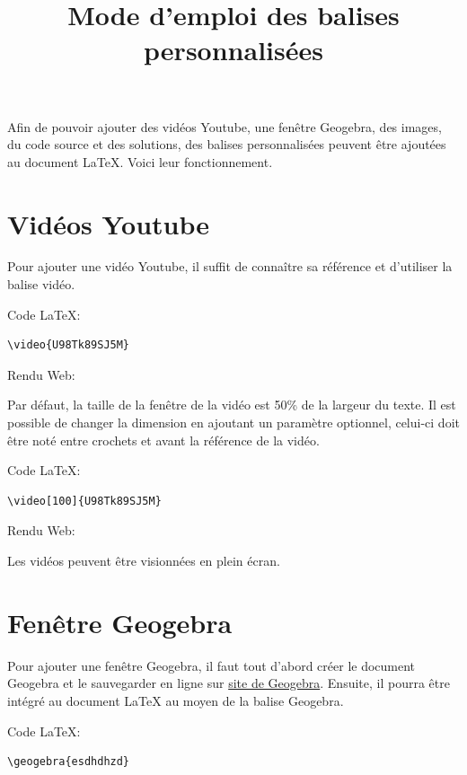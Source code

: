 \documentclass[a4paper,11pt]{article}
\begin{document}
\title{Mode d'emploi des balises personnalisées}
\date{}
\maketitle

Afin de pouvoir ajouter des vidéos Youtube, une fenêtre Geogebra, des images, du code source et des
solutions, des balises personnalisées peuvent être ajoutées au document LaTeX. Voici leur fonctionnement.

\section{Vidéos Youtube}
Pour ajouter une vidéo Youtube, il suffit de connaître sa référence et d’utiliser la balise vidéo.\par

Code LaTeX:
\begin{lstlisting}
\video{U98Tk89SJ5M}
\end{lstlisting}

Rendu Web:\par
{}

Par défaut, la taille de la fenêtre de la vidéo est 50\% de la largeur du texte. Il est possible de
changer la dimension en ajoutant un paramètre optionnel, celui-ci doit être noté entre crochets
et avant la référence de la vidéo.\par

Code LaTeX:
\begin{lstlisting}
\video[100]{U98Tk89SJ5M}
\end{lstlisting}

Rendu Web:\par
{}

Les vidéos peuvent être visionnées en plein écran.

\section{Fenêtre Geogebra}
Pour ajouter une fenêtre Geogebra, il faut tout d’abord créer le document Geogebra et le sauvegarder en ligne sur \href{https://www.geogebra.org/}{site de Geogebra}. Ensuite, il pourra être intégré au document LaTeX au moyen de la balise Geogebra.\par

Code LaTeX:
\begin{lstlisting}
\geogebra{esdhdhzd}
\end{lstlisting}
\end{document}
